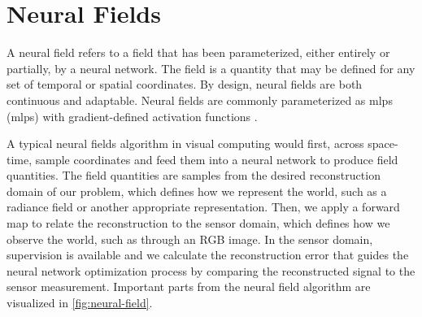 \section{Neural Fields} %
A neural field refers to a field that has been parameterized, either entirely or partially, by a neural network. The field is a quantity that may be defined for any set of temporal or spatial coordinates. By design, neural fields are both continuous and adaptable. Neural fields are commonly parameterized as \acrlong{mlp}s (\acrshort{mlp}s) with gradient-defined activation functions \cite{xie_neural_2022}.

A typical neural fields algorithm in visual computing would first, across space-time, sample coordinates and feed them into a neural network to produce field quantities. The field quantities are samples from the desired reconstruction domain of our problem, which defines how we represent the world, such as a radiance field or another appropriate representation. Then, we apply a forward map to relate the reconstruction to the sensor domain, which defines how we observe the world, such as through an RGB image. In the sensor domain, supervision is available and we calculate the reconstruction error that guides the neural network optimization process by comparing the reconstructed signal to the sensor measurement. Important parts from the neural field algorithm are visualized in \autoref{fig:neural-field}.




